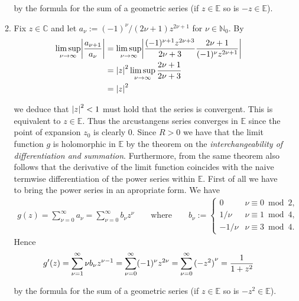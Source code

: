 \begin{enumerate}[label = \textbf{Exercise \arabic*.},wide = 0pt, itemsep=1.5ex]
\begin{enumerate}[label = (\alph*),wide = 0pt, itemsep=1.5ex]
			\noindent by the formula for the sum of a geometric series (if $z \in \mathbb{E}$ so is $-z \in \mathbb{E}$).

		\item Fix $z \in \mathbb{C}$ and let $a_\nu := (-1)^{\nu}/(2\nu + 1)z^{2\nu + 1}$ for $\nu \in \mathbb{N}_0$. By
			\begin{align*}
				\limsup_{\nu \to \infty} \abs[3]{\frac{a_{\nu + 1}}{a_{\nu}}} &= \limsup_{\nu \to \infty} \abs[3]{\frac{(-1)^{\nu + 1}z^{2\nu + 3}}{2\nu + 3}\frac{2\nu + 1}{(-1)^\nu z^{2\nu + 1}}}\\
				&= \abs[0]{z}^2 \limsup_{\nu \to \infty} \frac{2\nu + 1}{2\nu + 3}\\
				&= \abs[0]{z}^2
			\end{align*}

			\noindent we deduce that $\abs[0]{z}^2 < 1$ must hold that the series is convergent. This is equivalent to $z \in \mathbb{E}$. Thus the arcustangens series converges in $\mathbb{E}$ since the point of expansion $z_0$ is clearly $0$. Since $R > 0$ we have that the limit function $g$ is holomorphic in $\mathbb{E}$ by the theorem on the \emph{interchangeability of differentiation and summation}. Furthermore, from the same theorem also follows that the derivative of the limit function coincides with the naive termwise differentiation of the power series within $\mathbb{E}$. First of all we have to bring the power series in an apropriate form. We have
			\begin{align*}
				g(z) = \sum_{\nu = 0}^\infty a_\nu = \sum_{\nu = 0}^\infty b_\nu z^\nu \qquad \text{where} \qquad b_\nu := \begin{cases}
					0 & \nu \equiv 0 \bmod 2,\\
					1/\nu & \nu \equiv 1 \bmod 4,\\
					-1/\nu & \nu \equiv 3 \bmod 4.
				\end{cases}
			\end{align*}
			\noindent Hence
			\begin{equation}
				g'(z) = \sum_{\nu = 1}^\infty \nu b_\nu z^{\nu-1} = \sum_{\nu = 0}^\infty (-1)^\nu z^{2\nu} = \sum_{\nu = 0}^\infty \del[0]{-z^2}^\nu = \frac{1}{1 + z^2}
			\end{equation}

			\noindent by the formula for the sum of a geometric series (if $z \in \mathbb{E}$ so is $-z^2\in \mathbb{E}$).
	\end{enumerate}
\end{enumerate}
\printbibliography


